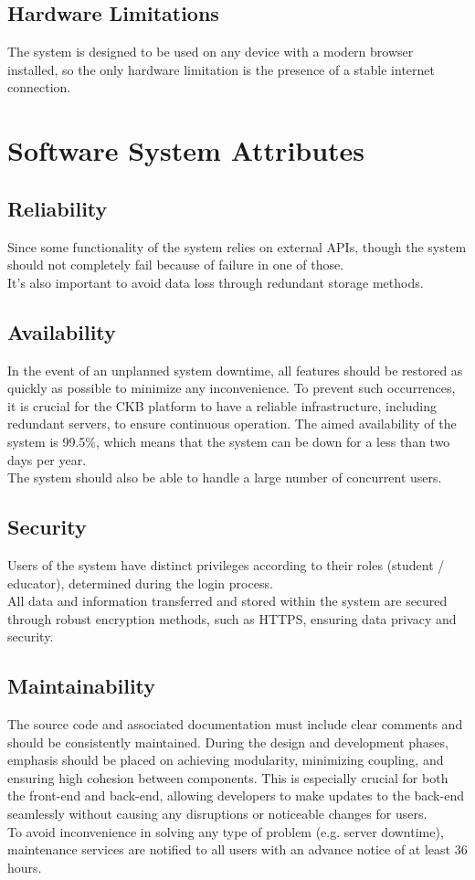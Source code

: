 \subsection*{Hardware Limitations}
The system is designed to be used on any device with a modern browser installed, so the only hardware limitation is the presence of a stable internet connection.\\

\section{Software System Attributes}
\subsection{Reliability}
Since some functionality of the system relies on external APIs, though the system should not completely fail because of failure in one of those.\\
It's also important to avoid data loss through redundant storage methods.

\subsection{Availability}
In the event of an unplanned system downtime, all features should be restored as quickly as possible to minimize any inconvenience. To prevent such occurrences, it is crucial for the CKB platform to have a reliable infrastructure, including redundant servers, to ensure continuous operation.
The aimed availability of the system is 99.5\%, which means that the system can be down for a less than two days per year.\\
The system should also be able to handle a large number of concurrent users.

\subsection{Security}
Users of the system have distinct privileges according to their roles (student / educator), determined during the login process.\\
All data and information transferred and stored within the system are secured through robust encryption methods, such as HTTPS, ensuring data privacy and security.\\

\subsection{Maintainability}
The source code and associated documentation must include clear comments and should be consistently maintained. During the design and development phases, emphasis should be placed on achieving modularity, minimizing coupling, and ensuring high cohesion between components.
This is especially crucial for both the front-end and back-end, allowing developers to make updates to the back-end seamlessly without causing any disruptions or noticeable changes for users.\\
To avoid inconvenience in solving any type of problem (e.g. server downtime), maintenance services are notified to all users with an advance notice of at least 36 hours.

